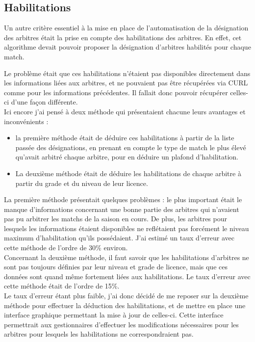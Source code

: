 \subsection{Habilitations}
\vspace{1cm}

Un autre critère essentiel à la mise en place de l’automatisation de la désignation des arbitres était la prise en compte des habilitations des arbitres. En effet, cet algorithme devait pouvoir proposer la désignation d’arbitres habilités pour chaque match.

Le problème était que ces habilitations n’étaient pas disponibles directement dans les informations liées aux arbitres, et ne pouvaient pas être récupérées via CURL comme pour les informations précédentes. Il fallait donc pouvoir récupérer celles-ci d’une façon différente.\\

Ici encore j’ai pensé à deux méthode qui présentaient chacune leurs avantages et inconvénients :

\begin{itemize}
    \item la première méthode était de déduire ces habilitations à partir de la liste passée des désignations, en prenant en compte le type de match le plus élevé qu’avait arbitré chaque arbitre, pour en déduire un plafond d’habilitation.
    \item La deuxième méthode était de déduire les habilitations de chaque arbitre à partir du grade et du niveau de leur licence.
\end{itemize}

La première méthode présentait quelques problèmes : le plus important était le manque d’informations concernant une bonne partie des arbitres qui n’avaient pas pu arbitrer les matchs de la saison en cours. De plus, les arbitres pour lesquels les informations étaient disponibles ne reflétaient pas forcément le niveau maximum d’habilitation qu’ils possédaient. J’ai estimé un taux d’erreur avec cette méthode de l’ordre de 30\% environ.\\

Concernant la deuxième méthode, il faut savoir que les habilitations d’arbitres ne sont pas toujours définies par leur niveau et grade de licence, mais que ces données sont quand même fortement liées aux habilitations. Le taux d’erreur avec cette méthode était de l’ordre de 15\%.\\

Le taux d’erreur étant plus faible, j’ai donc décidé de me reposer sur la deuxième méthode pour effectuer la déduction des habilitations, et de mettre en place une interface graphique permettant la mise à jour de celles-ci.  Cette interface permettrait aux gestionnaires d’effectuer les modifications nécessaires pour les arbitres pour lesquels les habilitations ne correspondraient pas.

